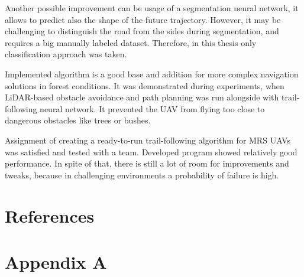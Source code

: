 Another possible improvement can be usage of a segmentation neural network, it allows to predict also the shape of the future trajectory. However, it may be challenging to distinguish the road from the sides during segmentation, and requires a big manually labeled dataset. Therefore, in this thesis only classification approach was taken.

Implemented algorithm is a good base and addition for more complex navigation solutions in forest conditions. It was demonstrated during experiments, when \acs{LiDAR}-based obstacle avoidance and path planning was run alongside with trail-following neural network. It prevented the \acs{UAV} from flying too close to dangerous obstacles like trees or bushes.

Assignment of creating a ready-to-run trail-following algorithm for \acs{MRS} \acs{UAV}s was satisfied and tested with a team. Developed program showed relatively good performance. In spite of that, there is still a lot of room for improvements and tweaks, because in challenging environments a probability of failure is high.



\chapter{References}

\printbibliography[heading=none,title={}]


\appendix
\renewcommand\chaptername{Appendix}

\renewcommand{\thechapter}{A}
\renewcommand\chaptername{Appendix A}

\chapter{Appendix A}


